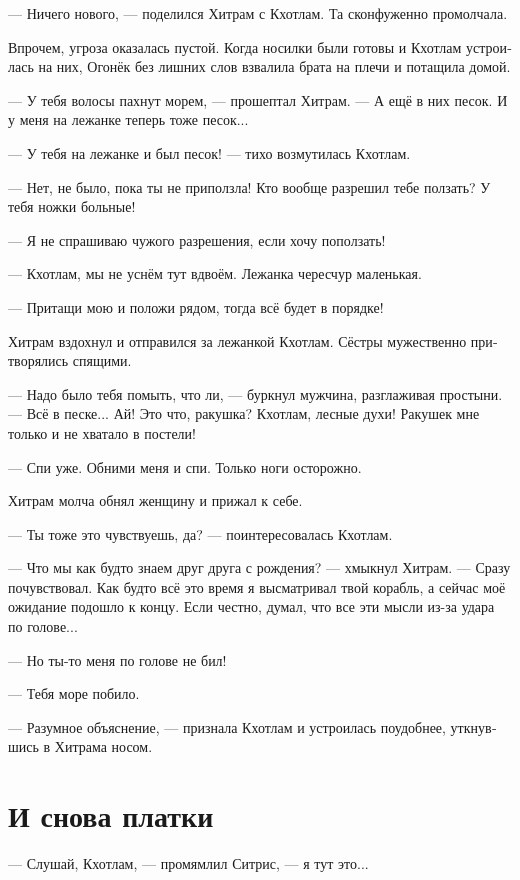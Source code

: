 \documentclass[a4paper,12pt,fleqn]{book}\usepackage{cooltooltips}\usepackage{polyglossia}\setdefaultlanguage[babelshorthands=true]{russian}\setotherlanguage{english}\defaultfontfeatures{Ligatures=TeX,Mapping=tex-text} \usepackage{xcolor}\definecolor{lightgray}{HTML}{bbbbbb}\color{lightgray}\newcommand{\ml}[3]{\textenglish{\textcolor{black}{#3}} }
\newcommand{\asterism}{\vspace{1em}{\centering\Large\bfseries$\ast~\ast~\ast$\par}\vspace{1em}}
\begin{document}
--- Ничего нового, --- поделился Хитрам с Кхотлам.
Та сконфуженно промолчала.

Впрочем, угроза оказалась пустой.
Когда носилки были готовы и Кхотлам устроилась на них, Огонёк без лишних слов взвалила брата на плечи и потащила домой.

\asterism

--- У тебя волосы пахнут морем, --- прошептал Хитрам.
--- А ещё в них песок.
И у меня на лежанке теперь тоже песок...

--- У тебя на лежанке и был песок! --- тихо возмутилась Кхотлам.

--- Нет, не было, пока ты не приползла!
Кто вообще разрешил тебе ползать?
У тебя ножки больные!

--- Я не спрашиваю чужого разрешения, если хочу поползать!

--- Кхотлам, мы не уснём тут вдвоём.
Лежанка чересчур маленькая.

--- Притащи мою и положи рядом, тогда всё будет в порядке!

Хитрам вздохнул и отправился за лежанкой Кхотлам.
Сёстры мужественно притворялись спящими.

--- Надо было тебя помыть, что ли, --- буркнул мужчина, разглаживая простыни.
--- Всё в песке...
Ай!
Это что, ракушка?
Кхотлам, лесные духи!
Ракушек мне только и не хватало в постели!

--- Спи уже.
Обними меня и спи.
Только ноги осторожно.

Хитрам молча обнял женщину и прижал к себе.

--- Ты тоже это чувствуешь, да? --- поинтересовалась Кхотлам.

--- Что мы как будто знаем друг друга с рождения? --- хмыкнул Хитрам.
--- Сразу почувствовал.
Как будто всё это время я высматривал твой корабль, а сейчас моё ожидание подошло к концу.
Если честно, думал, что все эти мысли из-за удара по голове...

--- Но ты-то меня по голове не бил!

--- Тебя море побило.

--- Разумное объяснение, --- признала Кхотлам и устроилась поудобнее, уткнувшись в Хитрама носом.

\section{И снова платки}

--- Слушай, Кхотлам, --- промямлил Ситрис, --- я тут это...
\end{document}
